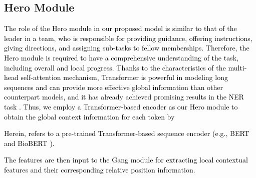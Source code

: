 \documentclass[11pt]{article}
\begin{document}
\subsection{Hero Module}
\textcolor{black}{
\textcolor{black}{The role of the Hero module in our proposed model is similar to that of the leader in a team, who is responsible for providing guidance, offering instructions, giving directions, and assigning sub-tasks to fellow memberships. Therefore, the Hero module is required to have a comprehensive understanding of the task, including overall and local progress.}
Thanks to the characteristics of the multi-head self-attention mechanism, Transformer is powerful in modeling long sequences and can provide more effective global information than other counterpart models, and it has already achieved promising results in the NER task \cite{luo2020hierarchical,beltagy2019scibert}. 
Thus, we employ a Transformer-based encoder as our Hero module to obtain the global context information  for each token  by

Herein,  refers to a pre-trained Transformer-based sequence encoder (e.g., BERT \cite{BERT} and BioBERT \cite{biobert}).
}
\textcolor{black}{The features  are then input to the Gang module for extracting local contextual features and their corresponding relative position information.}
\end{document}
